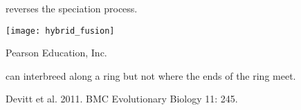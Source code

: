 \documentclass[t]{beamer}
\begin{document}
\begin{frame}[t]{ reverses the speciation process.}

	\centering
	\texttt{[image: hybrid\_fusion]}

	\vfilll
	
	\hfill \tiny \textcopyright Pearson Education, Inc.
\end{frame}

{
\begin{frame}[b]{ can interbreed along a ring but not where the ends of the ring meet.}
	
\tiny Devitt et al. 2011. BMC Evolutionary Biology 11: 245.
\end{frame}
}
\end{document}
